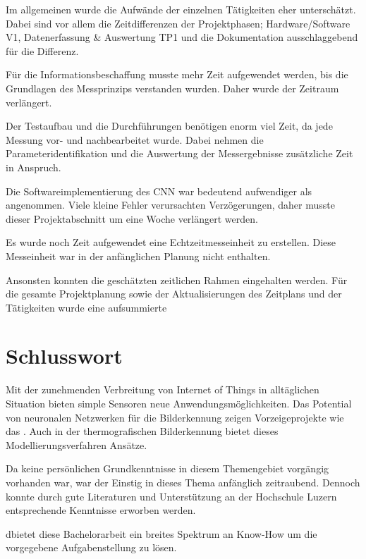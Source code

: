 Im allgemeinen wurde die Aufwände der einzelnen Tätigkeiten eher unterschätzt. Dabei sind vor allem die Zeitdifferenzen der Projektphasen; Hardware/Software V1, Datenerfassung \& Auswertung TP1 und die Dokumentation ausschlaggebend für die Differenz.

Für die Informationsbeschaffung musste mehr Zeit aufgewendet werden, bis die Grundlagen des Messprinzips verstanden wurden. Daher wurde der Zeitraum verlängert.

Der Testaufbau und die Durchführungen benötigen enorm viel Zeit, da jede Messung vor- und nachbearbeitet wurde. Dabei nehmen die Parameteridentifikation und die Auswertung der Messergebnisse zusätzliche Zeit in Anspruch. 

Die Softwareimplementierung des \ac{CNN} war bedeutend aufwendiger als angenommen. Viele kleine Fehler verursachten Verzögerungen, daher musste dieser Projektabschnitt um eine Woche verlängert werden. 

Es wurde noch Zeit aufgewendet eine Echtzeitmesseinheit zu erstellen. Diese Messeinheit war in der anfänglichen Planung nicht enthalten. 

Ansonsten konnten die geschätzten zeitlichen Rahmen eingehalten werden. Für die gesamte Projektplanung sowie der Aktualisierungen des Zeitplans und der Tätigkeiten wurde eine aufsummierte







\newpage
\section{Schlusswort}

Mit der zunehmenden Verbreitung von Internet of Things in alltäglichen Situation bieten simple Sensoren neue Anwendungsmöglichkeiten. Das Potential von neuronalen Netzwerken für die Bilderkennung zeigen Vorzeigeprojekte wie das . Auch in der thermografischen Bilderkennung bietet dieses Modellierungsverfahren Ansätze.

Da keine persönlichen Grundkenntnisse in diesem Themengebiet vorgängig vorhanden war, war der Einstig in dieses Thema anfänglich zeitraubend. Dennoch konnte durch gute Literaturen und Unterstützung an der Hochschule Luzern entsprechende Kenntnisse erworben werden. 

dbietet diese Bachelorarbeit ein breites Spektrum an Know-How um die vorgegebene Aufgabenstellung zu lösen.

